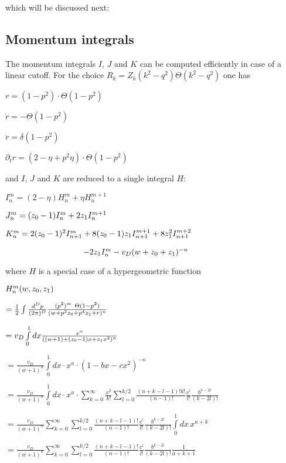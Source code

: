 \documentclass[a4paper,aps,prl,twocolumn,groupedaddress]{revtex4}
\begin{document}
\bigskip
\noindent
which will be discussed next:




\newpage
\subsection*{Momentum integrals}

\noindent
The momentum integrals $I$, $J$ and $K$ can be computed efficiently in case of 
a linear cutoff. For the choice \cite{Lit6} $R_k=Z_k(k^2-q^2)\Theta(k^2-q^2)$ one has

\bigskip $ r = (1-p^2)\cdot\Theta(1-p^2) $

\smallskip $ \dot{r} = -\Theta(1-p^2) $

\smallskip $ \ddot{r} = \delta(1-p^2) $

\smallskip $ \partial_t r = (2-\eta+p^2\eta)\cdot\Theta(1-p^2) $

\bigskip
\noindent
and $I$, $J$ and $K$ are reduced to a single integral $H$:

\bigskip $ I^m_n = (2-\eta) H_n^m + \eta H_n^{m+1} $

\smallskip $ J^m_n = (z_0-1) I^m_n + 2z_1 I^{m+1}_n $

\smallskip $ K^m_n = 2(z_0-1)^2 I^m_{n+1} + 8(z_0-1)z_1 I^{m+1}_{n+1} + 8z_1^2 I^{m+2}_{n+1} $

$ ~~~~~~~~~~~~~~~~~~~~~~~~~~~~\, - 2z_1 I^m_n  - v_D (w+z_0+z_1)^{-n} $

\bigskip
\noindent
where $H$ is a special case of a hypergeometric function

\bigskip $ H^m_n(w,z_0,z_1) $

\smallskip $ = \frac{1}{2} \int \frac{d^Dp}{(2\pi)^D} \frac{(p^2)^m ~ \Theta(1-p^2)}{(w+p^2z_0+p^4z_1+r)^n} $

$ = v_D \int \limits_0^1 dx \frac{x^a}{((w+1)+(z_0-1)x+z_1 x^2)^n} $

$ = \frac{v_D}{(w+1)^n} \int \limits_0^1 dx \cdot x^a \cdot (1-bx-cx^2)^{-n} $

$ = \frac{v_D}{(w+1)^n} \int \limits_0^1 dx \cdot x^a \cdot \sum \limits_{k=0}^\infty \frac{x^k}{k!} \sum \limits_{l=0}^{k/2} \frac{(n+k-l-1)!k!}{(n-1)!} \frac{c^l}{l!} \frac{b^{k-2l}}{(k-2l)!} $

$ = \frac{v_D}{(w+1)^n} \sum \limits_{k=0}^\infty \sum \limits_{l=0}^{k/2} \frac{(n+k-l-1)!}{(n-1)!} \frac{c^l}{l!} \frac{b^{k-2l}}{(k-2l)!} \int \limits_0^1 dx \, x^{a+k} $

$ = \frac{v_D}{(w+1)^n} \sum \limits_{k=0}^\infty \sum \limits_{l=0}^{k/2} \frac{(n+k-l-1)!}{(n-1)!} \frac{c^l}{l!} \frac{b^{k-2l}}{(k-2l)!} \frac{1}{a+k+1} $
\end{document}
